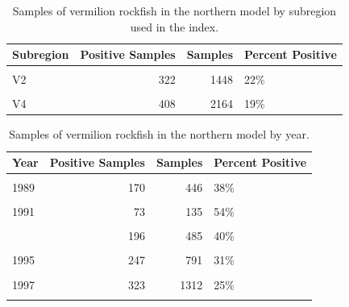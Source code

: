 \documentclass[11pt,
  english,
]{article}
\begin{document}
\FloatBarrier

\begin{table}

\caption{\label{tab:tab-region-debwv}Samples of vermilion rockfish in the northern model by subregion used in the index.}
\centering
\begin{tabular}[t]{lrrl}
\toprule
Subregion & Positive Samples & Samples & Percent Positive\\
\midrule
\cellcolor{gray!6}{V1} & \cellcolor{gray!6}{362} & \cellcolor{gray!6}{1317} & \cellcolor{gray!6}{27\%}\\
V2 & 322 & 1448 & 22\%\\
\cellcolor{gray!6}{V3} & \cellcolor{gray!6}{924} & \cellcolor{gray!6}{1668} & \cellcolor{gray!6}{55\%}\\
V4 & 408 & 2164 & 19\%\\
\bottomrule
\end{tabular}
\end{table}

\begin{table}

\caption{\label{tab:tab-year-debwv}Samples of vermilion rockfish in the northern model by year.}
\centering
\begin{tabular}[t]{lrrl}
\toprule
Year & Positive Samples & Samples & Percent Positive\\
\midrule
\cellcolor{gray!6}{1988} & \cellcolor{gray!6}{136} & \cellcolor{gray!6}{422} & \cellcolor{gray!6}{32\%}\\
1989 & 170 & 446 & 38\%\\
\cellcolor{gray!6}{1990} & \cellcolor{gray!6}{65} & \cellcolor{gray!6}{122} & \cellcolor{gray!6}{53\%}\\
1991 & 73 & 135 & 54\%\\
\cellcolor{gray!6}{1992} & \cellcolor{gray!6}{168} & \cellcolor{gray!6}{467} & \cellcolor{gray!6}{36\%}\\
\addlinespace
1993 & 196 & 485 & 40\%\\
\cellcolor{gray!6}{1994} & \cellcolor{gray!6}{189} & \cellcolor{gray!6}{555} & \cellcolor{gray!6}{34\%}\\
1995 & 247 & 791 & 31\%\\
\cellcolor{gray!6}{1996} & \cellcolor{gray!6}{238} & \cellcolor{gray!6}{963} & \cellcolor{gray!6}{25\%}\\
1997 & 323 & 1312 & 25\%\\
\addlinespace
\cellcolor{gray!6}{1998} & \cellcolor{gray!6}{211} & \cellcolor{gray!6}{899} & \cellcolor{gray!6}{23\%}\\
\bottomrule
\end{tabular}
\end{table}
\end{document}
